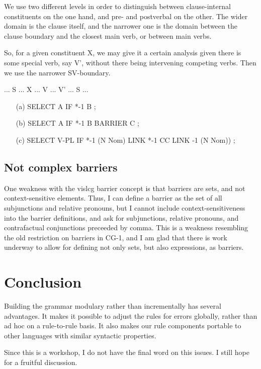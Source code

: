 \documentclass[a4paper,english]{article} %
\begin{document}
We use two different levels in order to distinguish between clause-internal constituents on the one hand, and pre- and postverbal on the other. The wider domain is the clause itself, and the narrower one is the domain between the clause boundary and the closest main verb, or between main verbs.%

So, for a given constituent X, we may give it a certain analysis given there is some special verb, say V', without there being intervening competing verbs. Then we use the narrower SV-boundary.%

\begin{example}\label{svx}
... S ... X ... V ... V' ... S ...
\end{example}

\begin{example}\label{ped}
\begin{itemize}
\item[(a)] SELECT A IF *-1 B ;
\item[(b)] SELECT A IF *-1 B BARRIER C ;
\item[(c)] SELECT V-PL IF *-1 (N Nom) LINK *-1 CC LINK -1 (N Nom)) ;
\end{itemize}
\end{example}

\subsection{Not complex barriers}

One weakness with the vislcg barrier concept is that barriers are sets, and not context-sensitive elements. Thus, I can define a barrier as the set of all subjunctions and relative pronouns, but I cannot include context-sensitiveness into the barrier definitions, and ask for subjunctions, relative pronouns, and contrafactual conjunctions preceeded by comma. This is a weakness resembling the old restriction on barriers in CG-1, and I am glad that there is work underway to allow for defining not only sets, but also expressions, as barriers.  %

\section{Conclusion}

Building the grammar modulary rather than incrementally has several advantages. It makes it possible to adjust the rules for errors globally, rather than ad hoc on a rule-to-rule basis. It also makes our rule components portable to other languages with similar syntactic properties.%



Since this is a workshop, I do not have the final word on this issues. I still hope for a fruitful discussion.%

       

\end{document}
